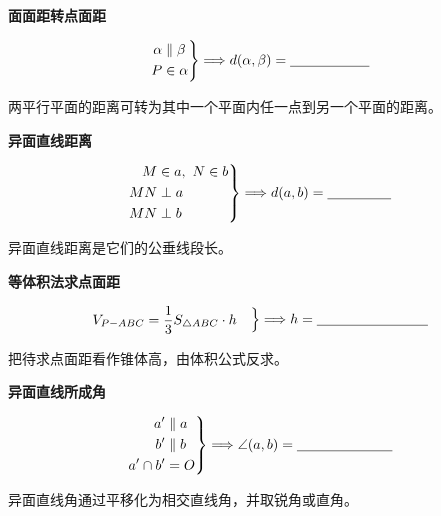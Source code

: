 \documentclass{exam-zh}
\begin{document}
\begin{question}[points=5]
  \textbf{面面距转点面距}\par
\[
\left.
\begin{aligned}
\alpha&\parallel\beta\\
P&\in\alpha
\end{aligned}
\right\}
\Longrightarrow
d(\alpha,\beta)=\underline{\hspace{20mm}}
\]


  \paren[$d(P,\beta)$]
  \begin{solutionblock}
    两平行平面的距离可转为其中一个平面内任一点到另一个平面的距离。
  \end{solutionblock}
\end{question}



\begin{question}[points=5]
  \textbf{异面直线距离}\par
\[
\left.
\begin{aligned}
M&\in a,\ N\in b\\
MN&\perp a\\
MN&\perp b
\end{aligned}
\right\}
\Longrightarrow
d(a,b)=\underline{\hspace{16mm}}
\]


  \paren[$MN$]
  \begin{solutionblock}
    异面直线距离是它们的公垂线段长。
  \end{solutionblock}
\end{question}



\begin{question}[points=5]
  \textbf{等体积法求点面距}\par
\[
\left.
\begin{aligned}
V_{P-ABC}&=\frac13 S_{\triangle ABC}\cdot h
\end{aligned}
\right\}
\Longrightarrow
h=\underline{\hspace{28mm}}
\]


  \begin{solutionblock}
    把待求点面距看作锥体高，由体积公式反求。
  \end{solutionblock}
\end{question}



\begin{question}[points=5]
  \textbf{异面直线所成角}\par
\[
\left.
\begin{aligned}
a'&\parallel a\\
b'&\parallel b\\
a'\cap b'&=O
\end{aligned}
\right\}
\Longrightarrow
\angle(a,b)=\underline{\hspace{24mm}}
\]


  \begin{solutionblock}
    异面直线角通过平移化为相交直线角，并取锐角或直角。
  \end{solutionblock}
\end{question}
\end{document}

